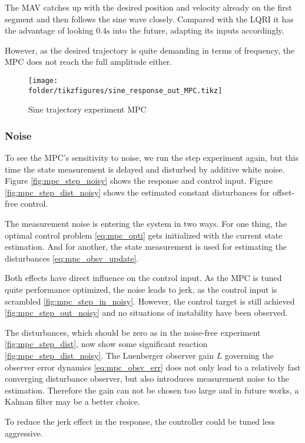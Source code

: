 The MAV catches up with the desired position and velocity already on the first segment and then follows the sine wave closely. Compared with the LQRI it has the advantage of looking $0.4\si{\second}$ into the future, adapting its inputs accordingly. 

However, as the desired trajectory is quite demanding in terms of frequency, the MPC does not reach the full amplitude either. 

\begin{figure}
\centering
\texttt{[image: \\folder/tikzfigures/sine\_response\_out\_MPC.tikz]}
\caption{Sine trajectory experiment MPC}
\label{fig:mpc_sine}
\end{figure} 

\subsubsection{Noise}
To see the MPC's sensitivity to noise, we run the step experiment again, but this time the state measurement is delayed and disturbed by additive white noise. Figure \ref{fig:mpc_step_noisy} shows the response and control input. Figure \ref{fig:mpc_step_dist_noisy} shows the estimated constant disturbances for offset-free control.

The measurement noise is entering the system in two ways. For one thing, the optimal control problem \ref{eq:mpc_opti} gets initialized with the current state estimation. And for another, the state measurement is used for estimating the disturbances \ref{eq:mpc_obsv_update}.

Both effects have direct influence on the control input. As the MPC is tuned quite performance optimized, the noise leads to jerk, as the control input is scrambled \ref{fig:mpc_step_in_noisy}. However, the control target is still achieved \ref{fig:mpc_step_out_noisy} and no situations of instability have been observed.


The disturbances, which should be zero as in the noise-free experiment \ref{fig:mpc_step_dist}, now show some significant reaction \ref{fig:mpc_step_dist_noisy}. The Luenberger observer gain $L$ governing the observer error dynamics \ref{eq:mpc_obsv_err} does not only lead to a relatively fast converging disturbance observer, but also introduces measurement noise to the estimation. Therefore the gain can not be chosen too large and in future works, a Kalman filter may be a better choice.

To reduce the jerk effect in the response, the controller could be tuned less aggressive.

